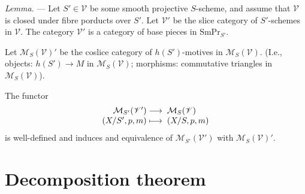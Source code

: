 \documentclass[a4paper,10pt]{article}
\newenvironment{lemma}{\medskip\textit{Lemma.} --- }{}
\def\basepieces{\mathscr{V}}
\def\smpr{\mathrm{SmPr}}
\begin{document}
\begin{lemma} %
	Let $S' \in \basepieces$ be some smooth projective $S$-scheme, and
	assume that $\basepieces$ is closed under fibre porducts over $S'$. Let
	$\basepieces'$ be the slice category of $S'$-schemes in $\basepieces$.
	The category $\basepieces'$ is a category of base pieces in
	$\smpr_{S'}$.

	Let $\mathcal{M}_{S}(\basepieces)'$ be the coslice category of
	$h(S')$-motives in $\mathcal{M}_{S}(\basepieces)$. (I.e., objects:
	$h(S') \to M$ in $\mathcal{M}_{S}(\basepieces)$; morphisms: commutative
	triangles in $\mathcal{M}_{S}(\basepieces)$).

	The functor
	\[
		\map{\mathcal{M}_{S'}(\basepieces')}%
		{\mathcal{M}_{S}(\basepieces)}%
		[(X/S', p, m)][(X/S, p, m)]
	\]
	is well-defined and induces and equivalence of
	$\mathcal{M}_{S'}(\basepieces')$ with $\mathcal{M}_{S}(\basepieces)'$.
\end{lemma} %


\section{Decomposition theorem}
\end{document}
